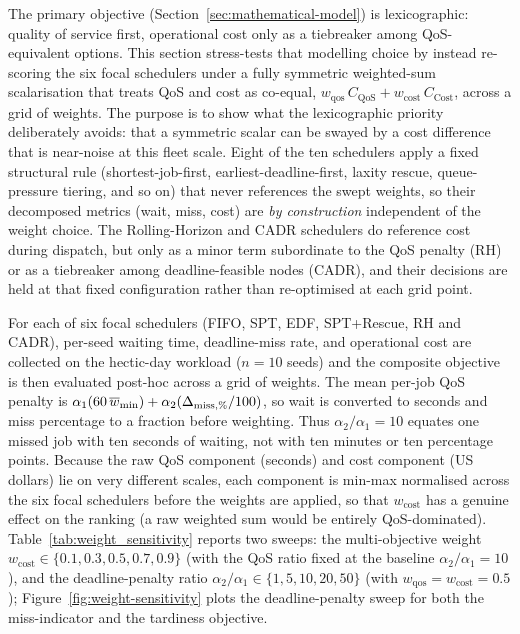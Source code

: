 {The primary objective (Section~\ref{sec:mathematical-model}) is lexicographic: quality of service first, operational cost only as a tiebreaker among QoS-equivalent options. This section stress-tests that modelling choice by instead re-scoring the six focal schedulers under a fully symmetric weighted-sum scalarisation that treats QoS and cost as co-equal, $w_{\text{qos}}\, C_{\text{QoS}} + w_{\text{cost}}\, C_{\text{Cost}}$, across a grid of weights. The purpose is to show what the lexicographic priority deliberately avoids: that a symmetric scalar can be swayed by a cost difference that is near-noise at this fleet scale. Eight of the ten schedulers apply a fixed structural rule (shortest-job-first, earliest-deadline-first, laxity rescue, queue-pressure tiering, and so on) that never references the swept weights, so their decomposed metrics (wait, miss, cost) are \emph{by construction} independent of the weight choice. The Rolling-Horizon and CADR schedulers do reference cost during dispatch, but only as a minor term subordinate to the QoS penalty (RH) or as a tiebreaker among deadline-feasible nodes (CADR), and their decisions are held at that fixed configuration rather than re-optimised at each grid point.

For each of six focal schedulers (FIFO, SPT, EDF, SPT+Rescue, RH and CADR), per-seed waiting time, deadline-miss rate, and operational cost are collected on the hectic-day workload ($n=10$ seeds) and the composite objective is then evaluated post-hoc across a grid of weights. The mean per-job QoS penalty is $\alpha_1(60\,\overline{w}_{\rm min}) + \alpha_2(\Delta_{\rm miss,\%}/100)$, so wait is converted to seconds and miss percentage to a fraction before weighting. Thus $\alpha_2/\alpha_1=10$ equates one missed job with ten seconds of waiting, not with ten minutes or ten percentage points. Because the raw QoS component (seconds) and cost component (US dollars) lie on very different scales, each component is min-max normalised across the six focal schedulers before the weights are applied, so that $w_{\text{cost}}$ has a genuine effect on the ranking (a raw weighted sum would be entirely QoS-dominated). Table~\ref{tab:weight_sensitivity} reports two sweeps: the multi-objective weight $w_{\text{cost}} \in \{0.1, 0.3, 0.5, 0.7, 0.9\}$ (with the QoS ratio fixed at the baseline $\alpha_2/\alpha_1 = 10$), and the deadline-penalty ratio $\alpha_2/\alpha_1 \in \{1, 5, 10, 20, 50\}$ (with $w_{\text{qos}} = w_{\text{cost}} = 0.5$); Figure~\ref{fig:weight-sensitivity} plots the deadline-penalty sweep for both the miss-indicator and the tardiness objective.

}
